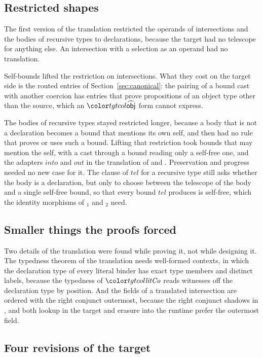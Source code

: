 \subsection{Restricted shapes}

The first version of the translation restricted the operands of intersections and the bodies of recursive types to declarations, because the target had no telescope for anything else. An intersection with a selection as an operand had no translation.

Self-bounds lifted the restriction on intersections. What they cost on the target side is the routed entries of Section~\ref{sec:canonical}: the pairing of a bound cast with another coercion has entries that prove propositions of an object type other than the source, which an $\form{obj}$ form cannot express.

The bodies of recursive types stayed restricted longer, because a body that is not a declaration becomes a bound that mentions its own self, and \FCdot then had no rule that proves or uses such a bound. Lifting that restriction took bounds that may mention the self, with a cast through a bound reading only a self-free one, and the adapters $\mathit{into}$ and $\mathit{out}$ in the translation of  and . Preservation and progress needed no new case for it. The clause of $\mathit{tel}$ for a recursive type still asks whether the body is a declaration, but only to choose between the telescope of the body and a single self-free bound, so that every bound $\mathit{tel}$ produces is self-free, which the identity morphisms of $_1$ and $_2$ need.

\subsection{Smaller things the proofs forced}

Two details of the translation were found while proving it, not while designing it. The typedness theorem of the translation needs well-formed contexts, in which the declaration type of every literal binder has exact type members and distinct labels, because the typedness of $\tgt{\mathit{litCo}}$ reads witnesses off the declaration type by position. And the fields of a translated intersection are ordered with the right conjunct outermost, because the right conjunct shadows in \DOTMNF, and both lookup in the target and erasure into the runtime prefer the outermost field.

\subsection{Four revisions of the target}

